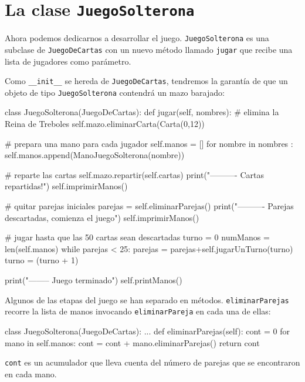 \section{La clase \texttt{JuegoSolterona}}


Ahora podemos dedicarnos a desarrollar el juego. \texttt{JuegoSolterona}
es una subclase de \texttt{JuegoDeCartas} con un nuevo método llamado
\texttt{jugar} que recibe una lista de jugadores como parámetro.

Como \texttt{\_\_init\_\_} se hereda de \texttt{JuegoDeCartas}, tendremos
la garantía de que un objeto de tipo \texttt{JuegoSolterona} contendrá
un mazo barajado:

\pagebreak

\begin{pythoncode}
class JuegoSolterona(JuegoDeCartas):
  def jugar(self, nombres):
    # elimina la Reina de Treboles
    self.mazo.eliminarCarta(Carta(0,12))

    # prepara una mano para cada jugador
    self.manos = []
    for nombre in nombres :
      self.manos.append(ManoJuegoSolterona(nombre))

    # reparte las  cartas
    self.mazo.repartir(self.cartas)
    print("---------- Cartas repartidas!")
    self.imprimirManos()

    # quitar parejas iniciales
    parejas = self.eliminarParejas()
    print("---------- Parejas descartadas, comienza el juego")
    self.imprimirManos()

    # jugar hasta que las 50 cartas sean descartadas
    turno = 0
    numManos = len(self.manos)
    while parejas < 25:
      parejas = parejas+self.jugarUnTurno(turno)
      turno = (turno + 1) %

    print("-------- Juego terminado")
    self.printManos()
\end{pythoncode}

\pagebreak

 Algunos de las etapas del juego se han separado en métodos. \texttt{eliminarParejas}
recorre la lista de manos invocando \texttt{eliminarPareja} en cada
una de ellas:
\begin{pythoncode}
class JuegoSolterona(JuegoDeCartas):
  ...
  def eliminarParejas(self):
    cont = 0
    for mano in self.manos:
      cont = cont + mano.eliminarParejas()
    return cont
\end{pythoncode}

\texttt{cont} es un acumulador que lleva cuenta del número de parejas
que se encontraron en cada mano.

